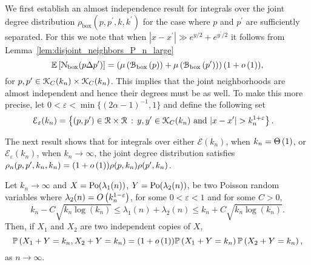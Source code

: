 We first establish an almost independence result for integrals over the joint degree distribution $\rho_{\text{box}}(p,p^\prime,k,k^\prime)$ for the case where  $p$ and $p^\prime$ are sufficiently separated. For this we note that when $|x - x^\prime| \gg e^{y/2} + e^{y^\prime/2}$ it follows from Lemma~\ref{lem:disjoint_neighbors_P_n_large}
\[
	\mathbb{E}\left[{\mathcal N}_{\text{box}}(p \Delta p^\prime)\right] = \left(\mu\left({\mathcal B}_{\text{box}}\left(p\right)\right) + \mu\left({\mathcal B}_{\text{box}}\left(p^\prime\right)\right)\right)(1 + o\left(1\right)),
\] 
for $p, p^\prime \in {\mathcal K}_{C}(k_n) \times {\mathcal K}_{C}(k_n)$. This implies that the joint neighborhoods are almost independent and hence their degrees must be as well. To make this more precise, let $0 < \varepsilon < \min\{(2\alpha - 1)^{-1},1\}$ and define the following set
\begin{align}
	\mathcal{E}_{\varepsilon}(k_n) &= \left\{(p,p^\prime) \in {\mathcal R} \times {\mathcal R}
		\, : \, y,y^\prime \in {\mathcal K}_{C}(k_n) \text{ and } |x - x^\prime| > k_n^{1 + \varepsilon} \right\}. \label{eq:def_joint_degree_set_E_growing_k}
\end{align}

The next result shows that for integrals over either $\mathcal{E}(k_n)$, when $k_n = \Theta\left(1\right)$, or $\mathcal{E}_{\varepsilon}(k_n)$, when $k_n \to \infty$, the joint degree distribution satisfies $\rho_n(p,p^\prime,k_n,k_n) = (1 + o\left(1\right))\rho(p,k_n)\rho(p^\prime,k_n)$.

\begin{lemma}\label{lem:near_independence_poisson}
Let $k_n \to \infty$ and $X = {\mathrm{Po}}(\lambda_1(n))$, $Y = {\mathrm{Po}}(\lambda_2(n))$, be two Poisson random variables where $\lambda_2(n) = O\left(k_n^{1-\varepsilon}\right)$, for some $0 < \varepsilon < 1$ and for some $C > 0$,
\[
	k_n - C\sqrt{k_n \log(k_n)} \le \lambda_1(n) + \lambda_2(n) \le k_n + C\sqrt{k_n \log(k_n)}.
\] 
Then, if $X_1$ and $X_2$ are two independent copies of $X$,
\[
	\mathbb{P}\left(X_1 + Y = k_n, X_2 + Y = k_n\right) = (1+o\left(1\right)) \mathbb{P}\left(X_1 + Y = k_n\right)\mathbb{P}\left(X_2 + Y = k_n\right),
\]
as $n \to \infty$.
\end{lemma}

